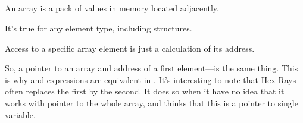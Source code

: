 ﻿\subsection{\Conclusion{}}

An array is a pack of values in memory located adjacently.

It's true for any element type, including structures.

Access to a specific array element is just a calculation of its address.

So, a pointer to an array and address of a first element---is the same thing.
This is why  and  expressions are equivalent in \CCpp.
It's interesting to note that Hex-Rays often replaces the first by the second.
It does so when it have no idea that it works with pointer to the whole array,
and thinks that this is a pointer to single variable.
